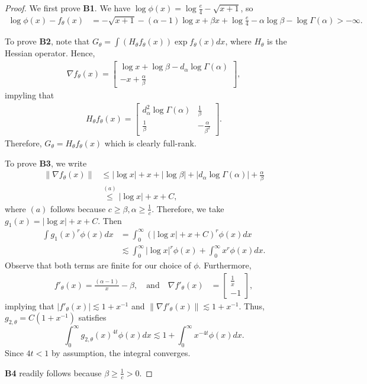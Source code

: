 \documentclass{article}
\begin{document}
\begin{proof}
We first prove \textbf{B1}. We have $\log \phi(x) = \log \frac{e}{4} - \sqrt{x + 1}$, so
\begin{align*}
\log \phi(x) - f_{\theta}(x) &= - \sqrt{x+1} - (\alpha - 1)\log x + \beta x +  
       \log \frac{e}{4} - \alpha \log \beta - \log \Gamma(\alpha) > - \infty.
\end{align*}

To prove \textbf{B2}, note that $G_\theta = \int (H_\theta f_\theta(x) ) \exp f_\theta(x) dx$, where $H_\theta$ is the Hessian operator. Hence,
\begin{align*}
\nabla f_\theta(x) = \left[ \begin{array}{c}
                   \log x + \log \beta - d_{\alpha} \log \Gamma(\alpha) \\
                   -x + \frac{\alpha}{\beta} 
              \end{array} \right],
\end{align*}
impyling that
\begin{align*}
H_\theta f_\theta(x) =  \left[ \begin{array}{cc}
                 d^2_\alpha \log \Gamma(\alpha) & \frac{1}{\beta} \\
                 \frac{1}{\beta} & - \frac{\alpha}{\beta^2}
              \end{array} \right].
\end{align*}
Therefore, $G_\theta = H_\theta f_\theta(x)$ which is clearly full-rank.

To prove \textbf{B3}, we write
\begin{align*}
\| \nabla f_\theta(x) \| &\leq | \log x | + x + |\log \beta| + | d_\alpha \log \Gamma(\alpha) | + \frac{\alpha}{\beta} \\
       &\stackrel{(a)} \leq |\log x | + x + C,
\end{align*}
where $(a)$ follows because $c \geq \beta, \alpha \geq \frac{1}{c}$. Therefore, we take $g_1(x) = |\log x| + x + C$. Then
\begin{align*}
\int g_1(x)^r \phi(x) dx &= \int_0^\infty (|\log x| + x + C)^r \phi(x) dx \\
        &\lesssim \int_0^\infty |\log x|^r \phi(x) + \int_0^\infty x^r \phi(x) dx.
\end{align*}
Observe that both terms are finite for our choice of $\phi$. Furthermore,
\begin{align*}
f'_\theta(x) = \frac{(\alpha - 1)}{x} - \beta, \quad \text{and} \quad \nabla f'_\theta(x) &= \left[ \begin{array}{c}
                  \frac{1}{x} \\
                    -1
           \end{array} \right],
\end{align*}
implying that $|f'_\theta(x)| \lesssim 1 + x^{-1}$ and $\| \nabla f'_\theta(x) \| \lesssim 1 + x^{-1}$. Thus, $g_{2, \theta} = C( 1 + x^{-1})$ satisfies
\[
\int_0^\infty g_{2,\theta}(x)^{4t} \phi(x) dx \lesssim 1 + \int_0^\infty x^{-4t} \phi(x) dx.
\]
Since $4t < 1$ by assumption, the integral converges.

\textbf{B4} readily follows because $\beta \geq \frac{1}{c} > 0$. 
\end{proof}
\end{document}
